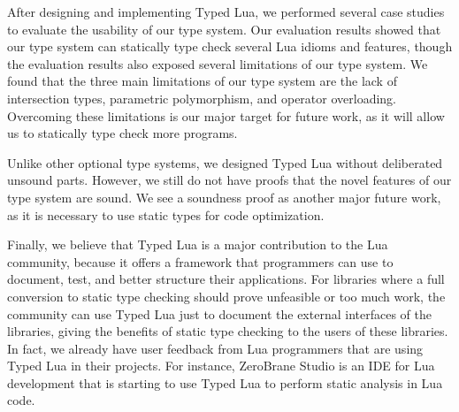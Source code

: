 After designing and implementing Typed Lua, we performed several
case studies to evaluate the usability of our type system.
Our evaluation results showed that our type system can statically
type check several Lua idioms and features, though the evaluation
results also exposed several limitations of our type system.
We found that the three main limitations of our type system are
the lack of intersection types, parametric polymorphism, and operator overloading.
Overcoming these limitations is our major target for future work,
as it will allow us to statically type check more programs.

Unlike other optional type systems, we designed Typed Lua without
deliberated unsound parts.
However, we still do not have proofs that the novel features of
our type system are sound.
We see a soundness proof as another major future work, as it is
necessary to use static types for code optimization.

Finally, we believe that Typed Lua is a major contribution to the Lua community,
because it offers a framework that programmers can use to document,
test, and better structure their applications.
For libraries where a full conversion to static type checking should
prove unfeasible or too much work, the community can use Typed Lua
just to document the external interfaces of the libraries,
giving the benefits of static type checking to the users of these
libraries.
In fact, we already have user feedback from Lua programmers that are
using Typed Lua in their projects.
For instance, ZeroBrane Studio is an IDE for Lua development that is
starting to use Typed Lua to perform static analysis in Lua code.


